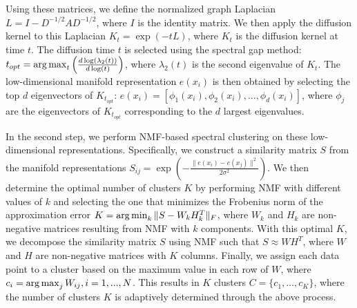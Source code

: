 Using these matrices, we define the normalized graph Laplacian $L = I - D^{-1/2}AD^{-1/2}$, where $I$ is the identity matrix. We then apply the diffusion kernel to this Laplacian $K_t = \exp(-tL)$, where $K_t$ is the diffusion kernel at time $t$. The diffusion time $t$ is selected using the spectral gap method: $t_{opt} = \operatorname*{arg\,max}_t \left(\frac{d\log(\lambda_2(t))}{d\log(t)}\right)$, where $\lambda_2(t)$ is the second eigenvalue of $K_t$. The low-dimensional manifold representation $e(x_i)$ is then obtained by selecting the top $d$ eigenvectors of $K_{t_{opt}}$: $
e(x_i) = [\phi_1(x_i), \phi_2(x_i), ..., \phi_d(x_i)]$,
where $\phi_j$ are the eigenvectors of $K_{t_{opt}}$ corresponding to the $d$ largest eigenvalues.

In the second step, we perform NMF-based spectral clustering on these low-dimensional representations. Specifically, we construct a similarity matrix $S$ from the manifold representations $S_{ij} = \exp(-\frac{\|e(x_i) - e(x_j)\|^2}{2\sigma^2})$.
We then determine the optimal number of clusters $K$ by performing NMF with different values of $k$ and selecting the one that minimizes the Frobenius norm of the approximation error $K = \operatorname*{arg\,min}_k \|S - W_kH_k^T\|_F$, where $W_k$ and $H_k$ are non-negative matrices resulting from NMF with $k$ components. With this optimal $K$, we decompose the similarity matrix $S$ using NMF such that $S \approx WH^T$, where $W$ and $H$ are non-negative matrices with $K$ columns.
Finally, we assign each data point to a cluster based on the maximum value in each row of $W$, where $c_i = \operatorname*{arg\,max}_j W_{ij}, i = 1, ..., N$. This results in $K$ clusters $C = \{c_1, \ldots, c_K\}$, where the number of clusters $K$ is adaptively determined through the above process.



